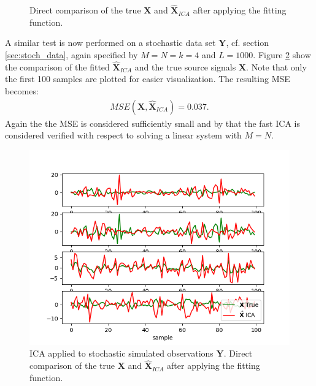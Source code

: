 \begin{figure}[H]
\begin{minipage}[t]{.45\textwidth}
	\caption{Direct comparison of the true $\textbf{X}$ and $\hat{\textbf{X}}_{ICA}$ after applying the fitting function.}
	\label{fig:appica2}
    \end{minipage}
\end{figure}

A similar test is now performed on a stochastic data set  $\textbf{Y}$, cf. section \ref{sec:stoch_data}, again specified by $M=N=k=4$ and $L=1000$. 
Figure \ref{fig:appica3} show the comparison of the fitted $\hat{\textbf{X}}_{ICA}$ and the true source signals $\textbf{X}$. Note that only the first 100 samples are plotted for easier visualization. The resulting MSE becomes:
\begin{align*}
MSE(\textbf{X},\hat{\textbf{X}}_{ICA}) = 0.037.
\end{align*}       
Again the the MSE is considered sufficiently small and by that the fast ICA is considered verified with respect to solving a linear system with $M=N$. 
\begin{figure}[H]
	\centering
	\includegraphics[scale=0.5]{figures/ICAapp/ICA_app3.png}
	\caption{ICA applied to stochastic simulated observations $\textbf{Y}$. Direct comparison of the true $\textbf{X}$ and $\hat{\textbf{X}}_{ICA}$ after applying the fitting function.}
	\label{fig:appica3}
\end{figure}

